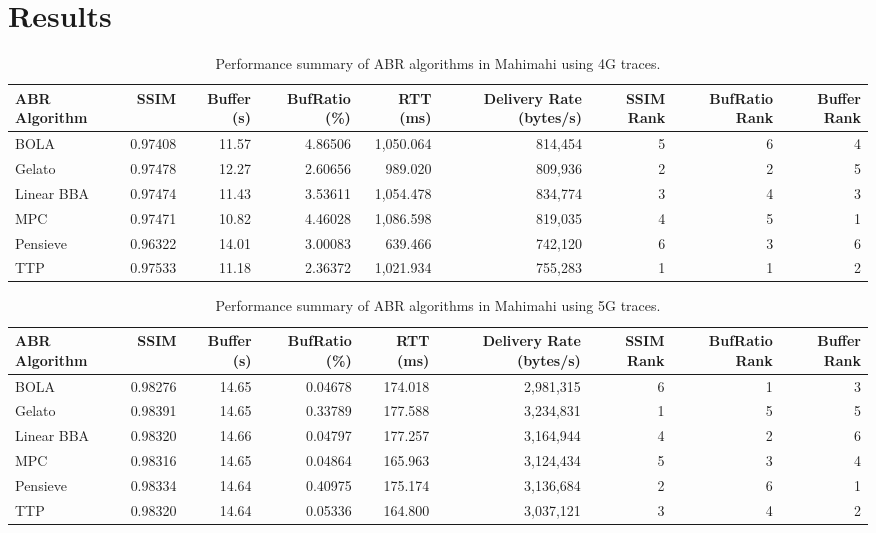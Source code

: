 \section{Results}\label{s:evaluation}

\begin{table}[htbp]
\centering
\small
\caption{Performance summary of ABR algorithms in Mahimahi using 4G traces.}
\label{tab:abr_results_4g}
\begin{tabular}{@{\hskip 4pt}l@{\hskip 6pt}r@{\hskip 6pt}r@{\hskip 6pt}r@{\hskip 6pt}r@{\hskip 6pt}r@{\hskip 6pt}r@{\hskip 6pt}r@{\hskip 6pt}r@{\hskip 4pt}}
\toprule
\textbf{ABR Algorithm} & \textbf{SSIM} & \textbf{Buffer (s)} & \textbf{BufRatio (\%)} & \textbf{RTT (ms)} & \textbf{Delivery Rate (bytes/s)} & \textbf{SSIM Rank} & \textbf{BufRatio Rank} & \textbf{Buffer Rank} \\
\midrule
BOLA      & 0.97408 & 11.57 & 4.86506 & 1{,}050.064 & 814{,}454   & 5 & 6 & 4 \\
Gelato    & 0.97478 & 12.27 &  2.60656 &   989.020 & 809{,}936   & 2 & 2 & 5 \\
Linear BBA    & 0.97474 & 11.43 & 3.53611 & 1{,}054.478 & 834{,}774 & 3 & 4 & 3 \\
MPC       & 0.97471 & 10.82 & 4.46028 & 1{,}086.598 & 819{,}035   & 4 & 5 & 1 \\
Pensieve  & 0.96322 & 14.01 &  3.00083 &   639.466 & 742{,}120   & 6 & 3 & 6 \\
TTP       & 0.97533 & 11.18 &  2.36372 & 1{,}021.934 & 755{,}283   & 1 & 1 & 2 \\
\bottomrule
\end{tabular}
\end{table}

\begin{table}[htbp]
\centering
\small
\caption{Performance summary of ABR algorithms in Mahimahi using 5G traces.}
\label{tab:abr_results_mahimahi5g}
\begin{tabular}{@{\hskip 4pt}l@{\hskip 6pt}r@{\hskip 6pt}r@{\hskip 6pt}r@{\hskip 6pt}r@{\hskip 6pt}r@{\hskip 6pt}r@{\hskip 6pt}r@{\hskip 6pt}r@{\hskip 4pt}}
\toprule
\textbf{ABR Algorithm} & \textbf{SSIM} & \textbf{Buffer (s)} & \textbf{BufRatio (\%)} & \textbf{RTT (ms)} & \textbf{Delivery Rate (bytes/s)} & \textbf{SSIM Rank} & \textbf{BufRatio Rank} & \textbf{Buffer Rank} \\
\midrule
BOLA      & 0.98276 & 14.65 & 0.04678 & 174.018 & 2{,}981{,}315 & 6 & 1 & 3 \\
Gelato    & 0.98391 & 14.65 & 0.33789 & 177.588 & 3{,}234{,}831 & 1 & 5 & 5 \\
Linear BBA    & 0.98320 & 14.66 & 0.04797 & 177.257 & 3{,}164{,}944 & 4 & 2 & 6 \\
MPC       & 0.98316 & 14.65 & 0.04864 & 165.963 & 3{,}124{,}434 & 5 & 3 & 4 \\
Pensieve  & 0.98334 & 14.64 & 0.40975 & 175.174 & 3{,}136{,}684 & 2 & 6 & 1 \\
TTP       & 0.98320 & 14.64 & 0.05336 & 164.800 & 3{,}037{,}121 & 3 & 4 & 2 \\
\bottomrule
\end{tabular}
\end{table}

